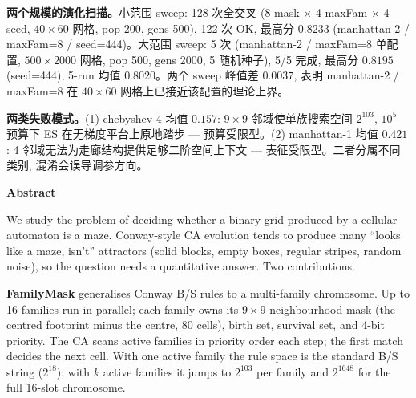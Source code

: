 \noindent\textbf{两个规模的演化扫描。}小范围 sweep: 128 次全交叉 (8 mask $\times$ 4 maxFam $\times$ 4 seed, $40 \times 60$ 网格, pop 200, gens 500), 122 次 OK, 最高分 $0.8233$ (manhattan-2 / maxFam=8 / seed=444)。大范围 sweep: 5 次 (manhattan-2 / maxFam=8 单配置, $500 \times 2000$ 网格, pop 500, gens 2000, 5 随机种子), 5/5 完成, 最高分 $0.8195$ (seed=444), 5-run 均值 $0.8020$。两个 sweep 峰值差 $0.0037$, 表明 manhattan-2 / maxFam=8 在 $40 \times 60$ 网格上已接近该配置的理论上界。

\noindent\textbf{两类失败模式。}(1) chebyshev-4 均值 $0.157$: $9 \times 9$ 邻域使单族搜索空间 $2^{103}$, $10^5$ 预算下 ES 在无梯度平台上原地踏步 --- 预算受限型。(2) manhattan-1 均值 $0.421$: 4 邻域无法为走廊结构提供足够二阶空间上下文 --- 表征受限型。二者分属不同类别, 混淆会误导调参方向。

\vspace{0.5em}
\begin{center}
{\large\bfseries\textcolor{Vermilion}{Abstract}}
\end{center}

\noindent
We study the problem of deciding whether a binary grid produced by a cellular automaton is a maze. Conway-style CA evolution tends to produce many ``looks like a maze, isn't'' attractors (solid blocks, empty boxes, regular stripes, random noise), so the question needs a quantitative answer. Two contributions.

\noindent\textbf{FamilyMask} generalises Conway B/S rules to a multi-family chromosome. Up to 16 families run in parallel; each family owns its $9{\times}9$ neighbourhood mask (the centred footprint minus the centre, 80 cells), birth set, survival set, and 4-bit priority. The CA scans active families in priority order each step; the first match decides the next cell. With one active family the rule space is the standard B/S string ($2^{18}$); with $k$ active families it jumps to $2^{103}$ per family and $2^{1648}$ for the full 16-slot chromosome.

